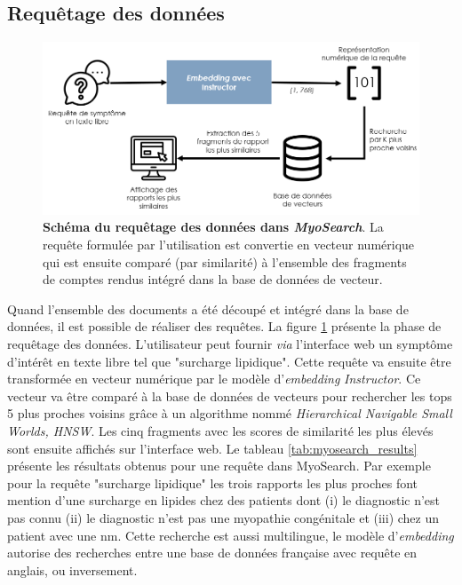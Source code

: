 \subsection{Requêtage des données}
\begin{figure}[!ht]
 \centering
 \includegraphics[width=1\textwidth]{figures/myosearch_query.png}
 \caption[Requêtage des données dans \textit{MyoSearch}]{\textbf{Schéma du requêtage des données dans \textit{MyoSearch}}. La requête formulée par l'utilisation est convertie en vecteur numérique qui est ensuite comparé (par similarité) à l'ensemble des fragments de comptes rendus intégré dans la base de données de vecteur.}
 \label{fig:myosearch_query}
\end{figure}
Quand l'ensemble des documents a été découpé et intégré dans la base de données, il est possible de réaliser des requêtes. La figure \ref{fig:myosearch_query} présente la phase de requêtage des données. L'utilisateur peut fournir \textit{via} l'interface web un symptôme d'intérêt en texte libre tel que "surcharge lipidique". Cette requête va ensuite être transformée en vecteur numérique par le modèle d'\textit{embedding }\textit{Instructor}. Ce vecteur va être comparé à la base de données de vecteurs pour rechercher les tops 5 plus proches voisins grâce à un algorithme nommé \textit{Hierarchical Navigable Small Worlds, HNSW}. Les cinq fragments avec les scores de similarité les plus élevés sont ensuite affichés sur l'interface web. Le tableau \ref{tab:myosearch_results} présente les résultats obtenus pour une requête dans MyoSearch. Par exemple pour la requête "surcharge lipidique" les trois rapports les plus proches font mention d'une surcharge en lipides chez des patients dont (i) le diagnostic n'est pas connu (ii) le diagnostic n'est pas une myopathie congénitale et (iii) chez un patient avec une \gls{nm}. Cette recherche est aussi multilingue, le modèle d'\textit{embedding} autorise des recherches entre une base de données française avec requête en anglais, ou inversement.
